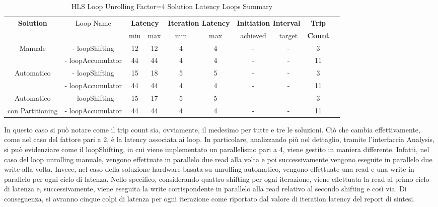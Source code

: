 \begin{table}[H]
    \centering
    \begin{tabular}{|c|c|c|c|c|c|c|c|c|c|}
        \hline
        \multicolumn{1}{|c|}{\textbf{Solution}} & \multicolumn{1}{|c|}{Loop Name} & \multicolumn{2}{|c|}{\textbf{Latency}} & \multicolumn{2}{c|}{\textbf{Iteration Latency}} & \multicolumn{2}{c|}{\textbf{Initiation Interval}} & \multicolumn{1}{c|}{\textbf{Trip}}  \\
        &  & min & max & min & max & achieved & target & \textbf{Count} \\
        \hline
        Manuale & - loopShifting & 12 & 12 & 4 & 4 & - & - & 3 \\
        & - loopAccumulator & 44 & 44 & 4 & 4 & - & - & 11 \\
        \hline
        Automatico & - loopShifting & 15 & 18 & 5 & 5 & - & - & 3 \\
        & - loopAccumulator & 44 & 44 & 4 & 4 & - & - & 11 \\
        \hline
        Automatico  & - loopShifting & 15 & 17 & 5 & 5 & - & - & 3 \\
        con Partitioning & - loopAccumulator & 44 & 44 & 4 & 4 & - & - & 11 \\
        \hline
    \end{tabular}
    \caption{HLS Loop Unrolling Factor=4 Solution Latency Loops Summary }
    \label{tab:hls-loop-unrolling-factor4-solution-loop-summary}
\end{table}

In questo caso si può notare come il trip count sia, ovviamente, il medesimo per tutte e tre le soluzioni. Ciò che cambia effettivamente, come nel caso del fattore pari a 2, è la latency associata ai loop. In particolare, analizzando più nel dettaglio, tramite l'interfaccia Analysis, si può evidenziare come il loopShifting, in cui viene implementato un parallelismo pari a 4, viene gestito in maniera differente. Infatti, nel caso del loop unrolling manuale, vengono effettuate in parallelo due read alla volta e poi successivamente vengono eseguite in parallelo due write alla volta. Invece, nel caso della soluzione hardware basata su unrolling automatico, vengono effettuate una read e una write in parallelo per ogni ciclo di latenza. Nello specifico, considerando quattro shifting per ogni iterazione, viene effettuata la read al primo ciclo di latenza e, successivamente, viene eseguita la write corrispondente in parallelo alla read relativo al secondo shifting e così via. Di conseguenza, si avranno cinque colpi di latenza per ogni iterazione come riportato dal valore di iteration latency del report di sintesi.

